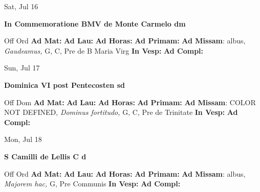 \documentclass[10pt]{memoir}
\begin{document}
\begin{center}
\begin{minipage}{3.5in}
\vspace{2em}
\begin{center}Sat, Jul 16
\end{center}
\textbf{ \large In Commemoratione BMV de Monte Carmelo
\textnormal{\normalsize dm}}

\begin{justify}Off Ord
\textbf{Ad Mat: }
\textbf{Ad Lau: }
\textbf{Ad Horas: }
\textbf{Ad Primam: }\textbf{Ad Missam}: albus, \textit{Gaudeamus,} G, C, Pre  de B Maria Virg
\textbf{In Vesp: }
\textbf{Ad Compl: }
\end{justify}
\end{minipage}
\end{center}

\begin{center}
\begin{minipage}{3.5in}
\vspace{2em}
\begin{center}Sun, Jul 17
\end{center}
\textbf{ \large Dominica VI post Pentecosten
\textnormal{\normalsize sd}}

\begin{justify}Off Dom
\textbf{Ad Mat: }
\textbf{Ad Lau: }
\textbf{Ad Horas: }
\textbf{Ad Primam: }\textbf{Ad Missam}: COLOR NOT DEFINED, \textit{Dominus fortitudo,} G, C, Pre de Trinitate
\textbf{In Vesp: }
\textbf{Ad Compl: }
\end{justify}
\end{minipage}
\end{center}

\begin{center}
\begin{minipage}{3.5in}
\vspace{2em}
\begin{center}Mon, Jul 18
\end{center}
\textbf{ \large S Camilli de Lellis C
\textnormal{\normalsize d}}

\begin{justify}Off Ord
\textbf{Ad Mat: }
\textbf{Ad Lau: }
\textbf{Ad Horas: }
\textbf{Ad Primam: }\textbf{Ad Missam}: albus, \textit{Majorem hac,} G, Pre Communis
\textbf{In Vesp: }
\textbf{Ad Compl: }
\end{justify}
\end{minipage}
\end{center}
\end{document}
